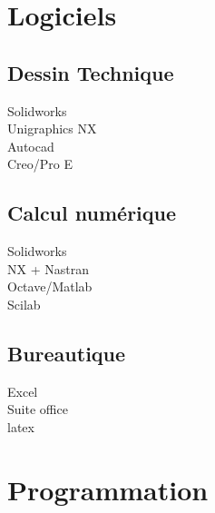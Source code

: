 \documentclass[10pt,a4paper,sans]{article}
\begin{document}
\begin{minipage}{0.23\textwidth}
    \section{Logiciels}
    \subsection{Dessin Technique}
    Solidworks\\
    Unigraphics NX\\
    Autocad\\
    Creo/Pro E\\
    \subsection{Calcul numérique}
    Solidworks\\
    NX + Nastran\\
    Octave/Matlab\\
    Scilab\\
    \subsection{Bureautique}
    Excel\\
    Suite office\\
    latex\\

    \section{Programmation}

\end{minipage}
\end{document}
